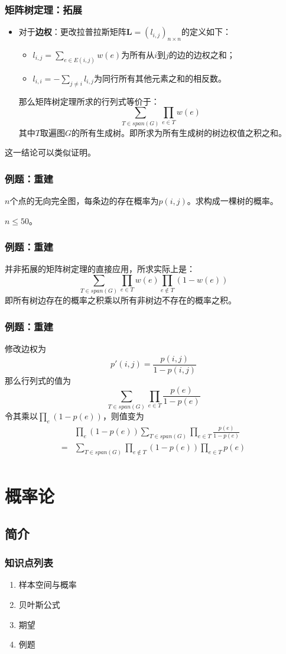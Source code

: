 \documentclass[9pt,dvipsnames]{beamer}
\begin{document}
\begin{frame}
	\frametitle{矩阵树定理：拓展}
	\begin{itemize}
		\item 对于\textbf{边权}\pause{}：更改拉普拉斯矩阵$\mathbf{L}=(l_{i,j})_{n\times n}$的定义如下：\begin{itemize}
				\item $l_{i,j}=\sum_{e\in E(i, j)} w(e)$为所有从$i$到$j$的边的边权之和；
				\item $l_{i,i}=-\sum_{j\neq i}l_{i,j}$为同行所有其他元素之和的相反数。
			\end{itemize}
			那么矩阵树定理所求的行列式等价于：
			\[ \sum_{T\in\mathit{span}(G)}\prod_{e\in T}w(e) \]
			其中$T$取遍图$G$的所有生成树。即所求为所有生成树的树边权值之积之和。
	\end{itemize}
	这一结论可以类似证明。
\end{frame}
\begin{frame}
	\frametitle{例题：重建}
	$n$个点的无向完全图，每条边的存在概率为$p(i,j)$。求构成一棵树的概率。

	$n\leq 50$。
\end{frame}
\begin{frame}
	\frametitle{例题：重建}
	并非拓展的矩阵树定理的直接应用，所求实际上是：
	\[ \sum_{T\in\mathit{span}(G)}\prod_{e\in T}w(e)\prod_{e\notin T}(1-w(e)) \]
	即所有树边存在的概率之积乘以所有非树边不存在的概率之积。
\end{frame}
\begin{frame}
	\frametitle{例题：重建}
	修改边权为
	\[p'(i,j)=\frac{p(i,j)}{1-p(i,j)}\]\pause
	那么行列式的值为
	\[ \sum_{T\in\mathit{span}(G)}\prod_{e\in T}\frac{p(e)}{1-p(e)} \]
	令其乘以$\prod_e(1-p(e))$，则值变为
	\begin{align*}
		  & \prod_e(1-p(e))\sum_{T\in\mathit{span}(G)}\prod_{e\in T}\frac{p(e)}{1-p(e)} \\
		= & \sum_{T\in\mathit{span}(G)}\prod_{e\notin T}(1-p(e))\prod_{e\in T}p(e)\\
	\end{align*}
\end{frame}


\section{概率论}
\subsection{简介}
\begin{frame}
	\frametitle{知识点列表}
	\begin{enumerate}
		\item 样本空间与概率
		\item 贝叶斯公式
		\item 期望
		\item 例题
	\end{enumerate}
\end{frame}
\end{document}
